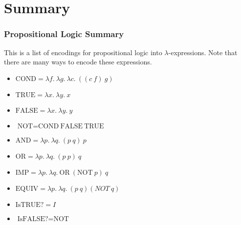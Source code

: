 \documentclass{beamer}
\begin{document}
\section{Summary}

\begin{frame}
	\frametitle{Propositional Logic Summary}

	This is a list of encodings for propositional logic into $\lambda$-expressions. Note that there are many ways to encode these expressions.

	\vspace{0.5cm}

	\begin{itemize}
		\item[] $\text{COND} = \lambda f. \ \lambda g. \ \lambda c. \ ((c \ f) \ g)$
		\item[] $\text{TRUE} = \lambda x. \ \lambda y. \ x$
		\item[] $\text{FALSE} = \lambda x. \ \lambda y. \ y$
		\item[] $\text{NOT} = \text{COND} \ \text{FALSE} \ \text{TRUE}$
		\item[] $\text{AND} = \lambda p. \ \lambda q. \ (p \ q) \ p$
		\item[] $\text{OR} = \lambda p. \ \lambda q. \ (p \ p) \ q$
		\item[] $\text{IMP} = \lambda p. \ \lambda q. \ \text{OR} \ (\text{NOT} \ p) \ q$
		\item[] $\text{EQUIV} = \lambda p. \ \lambda q. \ (p \ q) (NOT \ q)$
		\item[] $\text{IsTRUE?} = I$
		\item[] $\text{IsFALSE?} = \text{NOT}$
	\end{itemize}

\end{frame}


\end{document}
